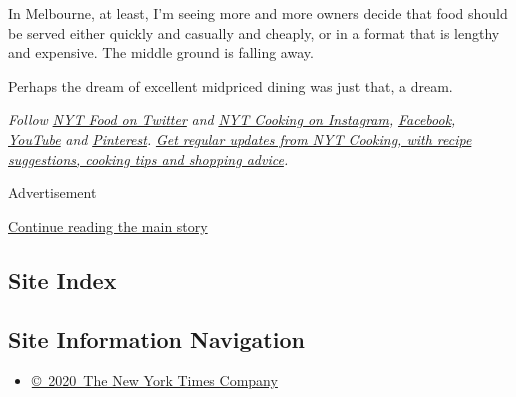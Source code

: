 In Melbourne, at least, I'm seeing more and more owners decide that food
should be served either quickly and casually and cheaply, or in a format
that is lengthy and expensive. The middle ground is falling away.

Perhaps the dream of excellent midpriced dining was just that, a dream.

\emph{Follow} \href{https://twitter.com/nytfood}{\emph{NYT Food on
Twitter}} \emph{and}
\href{https://www.instagram.com/nytcooking/}{\emph{NYT Cooking on
Instagram}}\emph{,}
\href{https://www.facebookcorewwwi.onion/nytcooking/}{\emph{Facebook}}\emph{,}
\href{https://www.youtube.com/nytcooking}{\emph{YouTube}} \emph{and}
\href{https://www.pinterest.com/nytcooking/}{\emph{Pinterest}}\emph{.}
\href{https://www.nytimes3xbfgragh.onion/newsletters/cooking}{\emph{Get
regular updates from NYT Cooking, with recipe suggestions, cooking tips
and shopping advice}}\emph{.}

Advertisement

\protect\hyperlink{after-bottom}{Continue reading the main story}

\hypertarget{site-index}{%
\subsection{Site Index}\label{site-index}}

\hypertarget{site-information-navigation}{%
\subsection{Site Information
Navigation}\label{site-information-navigation}}

\begin{itemize}
\tightlist
\item
  \href{https://help.nytimes3xbfgragh.onion/hc/en-us/articles/115014792127-Copyright-notice}{©~2020~The
  New York Times Company}
\end{itemize}

